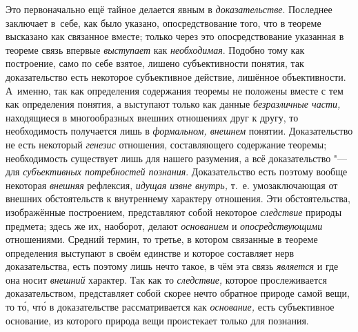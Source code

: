 Это первоначально ещё тайное делается явным в
{\em доказательстве}.
Последнее заключает в~себе, как было указано,
опосредствование того, что в теореме высказано как связанное вместе; только
через это опосредствование указанная в теореме связь впервые
{\em выступает} как
{\em необходимая}.
Подобно тому как построение, само по себе взятое, лишено
субъективности понятия, так доказательство есть некоторое субъективное
действие, лишённое объективности. А~именно, так как определения содержания
теоремы не положены вместе с тем как определения понятия, а выступают
только как данные {\em безразличные
части,} находящиеся в многообразных внешних отношениях друг
к другу, то необходимость получается лишь в
{\em формальном, внешнем}
понятии. Доказательство не есть некоторый
{\em генезис} отношения,
составляющего содержание теоремы; необходимость существует лишь для нашего
разумения, а всё доказательство "--- для
{\em субъективных потребностей
познания}. Доказательство есть поэтому вообще некоторая
{\em внешняя} рефлексия,
{\em идущая извне внутрь,}
т.~е. умозаключающая от внешних обстоятельств к внутреннему
характеру отношения. Эти обстоятельства, изображённые построением,
представляют собой некоторое
{\em следствие} природы
предмета; здесь же их, наоборот, делают
{\em основанием} и
{\em опосредствующими}
отношениями. Средний термин, то третье, в котором связанные в
теореме определения выступают в своём единстве и которое составляет нерв
доказательства, есть поэтому лишь нечто такое, в чём эта связь
{\em является} и где она
носит {\em внешний}
характер. Так как то
{\em следствие,} которое
прослеживается доказательством, представляет собой скорее нечто обратное
природе самой вещи, то т\'{о}, чт\'{о} в доказательстве рассматривается как
{\em основание,} есть
субъективное основание, из которого природа вещи проистекает только для
познания.

